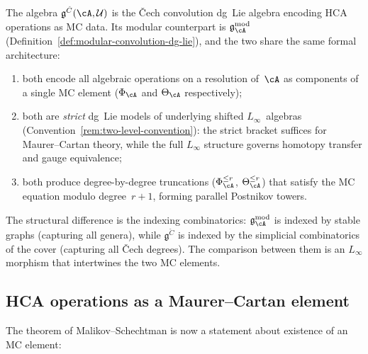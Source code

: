 \begin{remark}
\label{rem:cech-modular-parallel}
The algebra $\mathfrak{g}^{\check{C}}(\cA,\mathcal{U})$ is the
\v{C}ech convolution dg~Lie algebra encoding HCA operations as
MC data. Its modular counterpart is
$\mathfrak{g}^{\mathrm{mod}}_\cA$
(Definition~\ref{def:modular-convolution-dg-lie}), and the two share
the same formal architecture:
\begin{enumerate}[label=\textup{(\roman*)}]
\item both encode all algebraic operations on a resolution
 of~$\cA$ as components of a single MC element
 ($\Phi_\cA$ and $\Theta_\cA$ respectively);
\item both are \emph{strict} dg~Lie models of underlying shifted
 $L_\infty$~algebras
 (Convention~\ref{rem:two-level-convention}): the strict bracket
 suffices for Maurer--Cartan theory, while the full $L_\infty$
 structure governs homotopy transfer and gauge equivalence;
\item both produce degree-by-degree truncations
 ($\Phi_\cA^{\le r}$, $\Theta_\cA^{\le r}$) that satisfy the
 MC equation modulo degree~$r{+}1$, forming parallel Postnikov
 towers.
\end{enumerate}
The structural difference is the indexing combinatorics:
$\mathfrak{g}^{\mathrm{mod}}_\cA$ is indexed by stable graphs
(capturing all genera), while $\mathfrak{g}^{\check{C}}$ is indexed
by the simplicial combinatorics of the cover (capturing all \v{C}ech
degrees). The comparison between them is an $L_\infty$ morphism
that intertwines the two MC elements.
\end{remark}

\subsection{HCA operations as a Maurer--Cartan element}
\label{subsec:hca-mc}

The theorem of Malikov--Schechtman is now a statement about
existence of an MC element:

